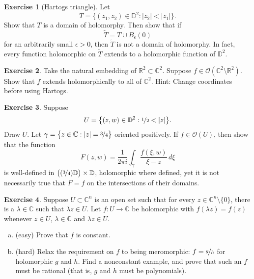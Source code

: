 \documentclass[12pt,openany]{book}
\newcommand{\sabs}[1]{\lvert {#1} \rvert}
\newcommand{\C}{{\mathbb{C}}}
\newcommand{\R}{{\mathbb{R}}}
\newcommand{\D}{{\mathbb{D}}}
\newcommand{\sO}{{\mathscr{O}}}
\newcommand{\myindex}[1]{#1\index{#1}}
\theoremstyle{plain}
\theoremstyle{remark}
\theoremstyle{definition}
\newenvironment{exbox}{%
    \def\FrameCommand{\vrule width 1pt \relax\hspace{10pt}}%
    \MakeFramed{\advance\hsize-\width\FrameRestore}%
}{%
    \endMakeFramed
}
\newenvironment{exparts}{%
    \leavevmode\begin{enumerate}[a),noitemsep,topsep=0pt,parsep=0pt,partopsep=0pt]
}{%
    \end{enumerate}
}
\theoremstyle{exercise}
\newtheorem{exercise}{Exercise}[section]
\theoremstyle{example}
\begin{document}
\begin{exbox}
\begin{exercise}[\myindex{Hartogs triangle}]\label{exercise:hartogstriangle}
Let
\begin{equation*}
T = \bigl\{ (z_1,z_2) \in \D^2 : \sabs{z_2} < \sabs{z_1} \bigr\} .
\end{equation*}
Show that $T$ is a domain of holomorphy.  Then show that if
\begin{equation*}
\widetilde{T} = T \cup B_{\epsilon}(0)
\end{equation*}
for an arbitrarily small $\epsilon > 0$, then $\widetilde{T}$ is not a domain
of holomorphy.  In fact, every function holomorphic on $\widetilde{T}$
extends to a holomorphic function of $\D^2$.
\end{exercise}

\begin{exercise} \label{exercise:C2minusR2}
Take the natural embedding of $\R^2 \subset \C^2$.  Suppose
$f \in \sO(\C^2 \setminus \R^2)$.  Show that $f$ extends holomorphically
to all of $\C^2$.  Hint: Change coordinates before using Hartogs.
\end{exercise}

\begin{exercise} \label{exercise:fatcylinder1}
Suppose
\begin{equation*}
U = \bigl\{ (z,w) \in \D^2 : \nicefrac{1}{2} < \sabs{z} \bigr\} .
\end{equation*}
Draw $U$.
Let $\gamma = \bigl\{ z \in \C : \sabs{z} = \nicefrac{3}{4} \bigr\}$ oriented positively.
If $f \in \sO(U)$, then show that the function
\begin{equation*}
F(z,w)
=
\frac{1}{2\pi i}
\int_\gamma \frac{f(\xi,w)}{\xi-z} \, d\xi
\end{equation*}
is well-defined in
$\bigl( (\nicefrac{3}{4}) \D \bigr) \times \D$, holomorphic where defined, yet
it is not necessarily true that $F = f$ on the intersections of their
domains.
\end{exercise}

\begin{exercise}
Suppose $U \subset \C^n$ is an open set such that for every
$z \in \C^n \setminus \{ 0 \}$, there is a $\lambda \in \C$ such that
$\lambda z \in U$.  Let $f \colon U \to \C$ be holomorphic with
$f(\lambda z) = f(z)$ whenever $z \in U$, $\lambda \in \C$ and $\lambda z
\in U$.
\begin{exparts}
\item
(easy) Prove that $f$ is constant.
\item
(hard) Relax the requirement on
$f$ to being meromorphic: $f = \nicefrac{g}{h}$
for holomorphic $g$ and $h$.
Find a nonconstant example, and prove that such an $f$ must be rational (that
is, $g$ and $h$ must be polynomials).
\end{exparts}
\end{exercise}


\end{exbox}
\end{document}
